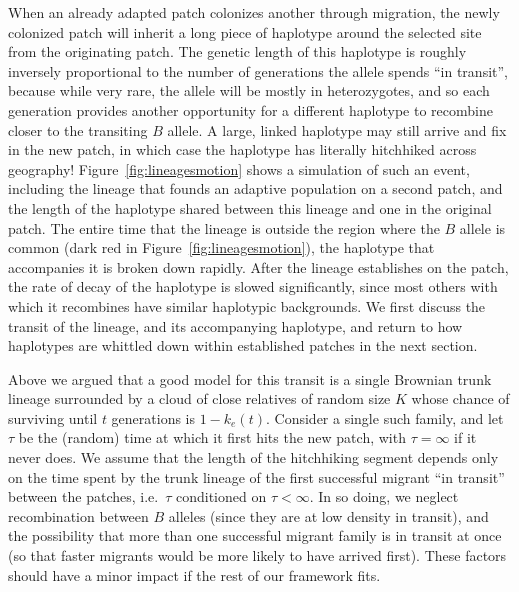 \documentclass{article}
\begin{document}
When an already adapted patch colonizes another through migration,
 the newly colonized patch will inherit a long piece of haplotype around the selected site from the originating patch.
The genetic length of this haplotype is roughly inversely proportional to the
number of generations the allele spends ``in transit'', 
because while very rare, the allele will be mostly in heterozygotes,
and so each generation provides another opportunity for a different haplotype to recombine closer to the transiting $B$ allele.
A large, linked haplotype may still arrive and fix in the new patch,
in which case the haplotype has literally hitchhiked across geography!
Figure~\ref{fig:lineagesmotion} shows a simulation of such an event,
including the lineage that founds an adaptive population on a second patch,
and the length of the haplotype shared between this lineage and one in the original patch.
The entire time that the lineage is outside the region where the $B$ allele is common (dark red in Figure~\ref{fig:lineagesmotion}), 
the haplotype that accompanies it is broken down rapidly. 
After the lineage establishes on the patch, the rate of decay of the haplotype is slowed significantly, 
since most others with which it recombines have similar haplotypic backgrounds. 
We first discuss the transit of the lineage, and its accompanying haplotype, and return
to how haplotypes are whittled down within established patches in the next section.


Above we argued that a good model for this transit is a single Brownian trunk lineage
surrounded by a cloud of close relatives of random size $K$
whose chance of surviving until $t$ generations is $1-k_e(t)$.
Consider a single such family, and let $\tau$ be the (random) time at which it first hits the new patch,
with $\tau = \infty$ if it never does. 
We assume that the length of the hitchhiking segment depends only on 
the time spent by the trunk lineage of the first successful migrant ``in transit'' between the patches,
i.e.\ $\tau$ conditioned on $\tau < \infty$.
In so doing, we neglect 
recombination between $B$ alleles (since they are at low density in transit),
and the possibility that more than one successful migrant family is in transit at once
(so that faster migrants would be more likely to have arrived first).
These factors should have a minor impact if the rest of our framework fits.
\end{document}
